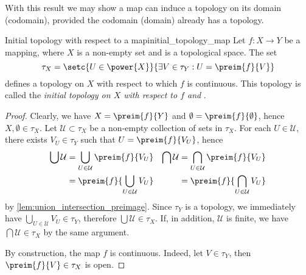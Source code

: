 With this result we may show a map can induce a topology on its domain (codomain), provided the codomain (domain) already has a topology.
\begin{proposition}{Initial topology with respect to a map}{initial_topology_map}
    Let \(f : X \to Y\) be a mapping, where \(X\) is a non-empty set and  is a topological space. The set
    \begin{equation*}
        \tau_X = \setc{U \in \power{X}}{\exists V \in \tau_{Y} : U = \preim{f}{V}}
    \end{equation*}
    defines a topology on \(X\) with respect to which \(f\) is continuous. This topology is called the \emph{initial topology on \(X\) with respect to \(f\) and }.
\end{proposition}
\begin{proof}
    Clearly, we have \(X = \preim{f}{Y}\) and \(\emptyset = \preim{f}{\emptyset}\), hence \(X, \emptyset \in \tau_X\). Let \(\mathcal{U} \subset \tau_X\) be a non-empty collection of sets in \(\tau_X\). For each \(U \in \mathcal{U}\), there exists \(V_U \in \tau_{Y}\) such that \(U = \preim{f}{V_U}\), hence
    \begin{align*}
        \bigcup \mathcal{U} &= \bigcup_{U \in \mathcal{U}} \preim{f}{V_U}&
        \bigcap \mathcal{U} &= \bigcap_{U \in \mathcal{U}} \preim{f}{V_U}\\
                             &= \preim{f}{\bigcup_{U \in \mathcal{U}} V_U}&
                             &= \preim{f}{\bigcap_{U \in \mathcal{U}} V_U}
    \end{align*}
    by \cref{lem:union_intersection_preimage}. Since \(\tau_Y\) is a topology, we immediately have \(\bigcup_{U \in \mathcal{U}} V_U \in \tau_Y\), therefore \(\bigcup \mathcal{U} \in \tau_X\). If, in addition, \(\mathcal{U}\) is finite, we have \(\bigcap \mathcal{U} \in \tau_X\) by the same argument.

    By construction, the map \(f\) is continuous. Indeed, let \(V \in \tau_Y\), then \(\preim{f}{V} \in \tau_X\) is open.
\end{proof}

